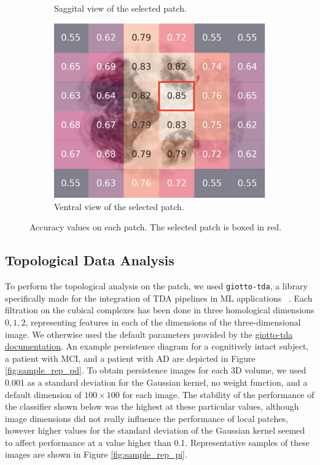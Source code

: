 \documentclass{article}
\begin{document}
\begin{figure}[htb]
\begin{subfigure}{0.32\textwidth}
    \caption{Saggital view of the selected patch.}
  \end{subfigure}
  \hfill
  \begin{subfigure}{0.32\textwidth}
    \includegraphics[width=\textwidth]{figures/perf_ventral.png}
    \caption{Ventral view of the selected patch.}
  \end{subfigure}
  \caption{Accuracy values on each patch. The selected patch is boxed in red.}
  \label{fig:acc}
\end{figure}

\subsection{Topological Data Analysis}\label{sec:tda_setup}

To perform the topological analysis on the patch, we used \texttt{giotto-tda}, a library
specifically made for the integration of TDA pipelines in ML applications
~\citep{tauzin2020giottotda}. Each filtration on the cubical complexes has been done in three
homological dimensions $0,1,2$, representing features in each of the dimensions of the
three-dimensional image. We otherwise used the default parameters provided by the
\href{https://giotto-ai.github.io/gtda-docs/latest/modules/generated/homology/gtda.homology.CubicalPersistence.html#id2}{giotto-tda
documentation}. An example persistence diagram for a cognitively intact subject, a patient with MCI,
and a patient with AD are depicted in Figure \ref{fig:sample_rep_pd}. To obtain persistence images
for each 3D volume, we used 0.001 as a standard deviation for the Gaussian kernel, no weight
function, and a default dimension of $100 \times 100$ for each image. The stability of the
performance of the classifier shown below was the highest at these particular values, although image
dimensions did not really influence the performance of local patches, however higher values for the
standard deviation of the Gaussian kernel seemed to affect performance at a value higher than 0.1.
Representative samples of these images are shown in Figure \ref{fig:sample_rep_pi}.
\end{document}
